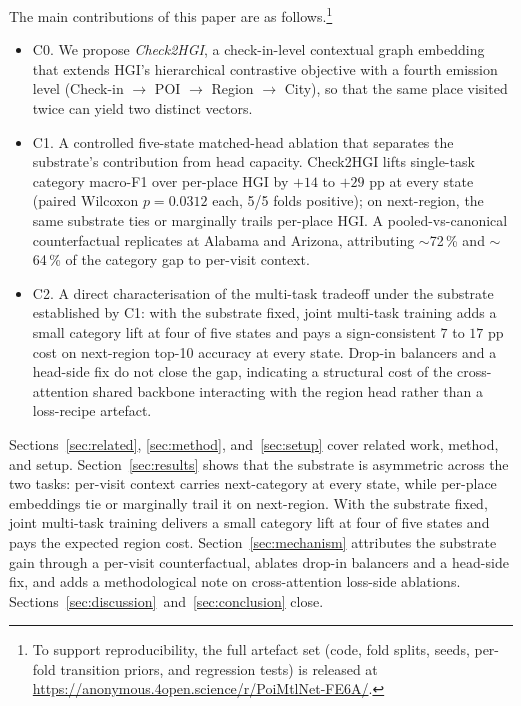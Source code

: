 The main contributions of this paper are as follows.\footnote{To support reproducibility, the full artefact set (code, fold splits, seeds, per-fold transition priors, and regression tests) is released at \url{https://anonymous.4open.science/r/PoiMtlNet-FE6A/}.}
\begin{itemize}
    \item C0. We propose \emph{Check2HGI}, a check-in-level contextual graph embedding that extends HGI's hierarchical contrastive objective with a fourth emission level (Check-in $\to$ POI $\to$ Region $\to$ City), so that the same place visited twice can yield two distinct vectors.
    \item C1. A controlled five-state matched-head ablation that separates the substrate's contribution from head capacity. Check2HGI lifts single-task category macro-F1 over per-place HGI by $+14$ to $+29$ pp at every state (paired Wilcoxon $p = 0.0312$ each, 5/5 folds positive); on next-region, the same substrate ties or marginally trails per-place HGI. A pooled-vs-canonical counterfactual replicates at Alabama and Arizona, attributing $\sim$72\,\% and $\sim$64\,\% of the category gap to per-visit context.
    \item C2. A direct characterisation of the multi-task tradeoff under the substrate established by C1: with the substrate fixed, joint multi-task training adds a small category lift at four of five states and pays a sign-consistent $7$ to $17$ pp cost on next-region top-10 accuracy at every state. Drop-in balancers and a head-side fix do not close the gap, indicating a structural cost of the cross-attention shared backbone interacting with the region head rather than a loss-recipe artefact.
\end{itemize}

Sections~\ref{sec:related}, \ref{sec:method}, and~\ref{sec:setup} cover related work, method, and setup. Section~\ref{sec:results} shows that the substrate is asymmetric across the two tasks: per-visit context carries next-category at every state, while per-place embeddings tie or marginally trail it on next-region. With the substrate fixed, joint multi-task training delivers a small category lift at four of five states and pays the expected region cost. Section~\ref{sec:mechanism} attributes the substrate gain through a per-visit counterfactual, ablates drop-in balancers and a head-side fix, and adds a methodological note on cross-attention loss-side ablations. Sections~\ref{sec:discussion}~and~\ref{sec:conclusion} close.
